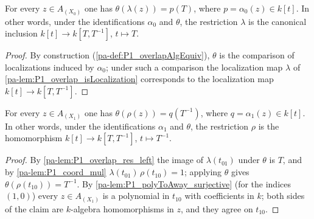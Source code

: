 \begin{lemma}
  \label{pa-lem:P1_overlap_res_left}
  \leanok

  For every \(z \in A_{(X_0)}\) one has \(\theta(\lambda(z)) = p(T)\), where
  \(p = \alpha_0(z) \in k[t]\). In other words, under the identifications
  \(\alpha_0\) and \(\theta\), the restriction \(\lambda\) is the canonical inclusion
  \(k[t] \to k[T, T^{-1}]\), \(t \mapsto T\).
\end{lemma}
\begin{proof}
  \leanok
  By construction (\ref{pa-def:P1_overlapAlgEquiv}), \(\theta\) is the comparison of
  localizations induced by \(\alpha_0\); under such a comparison the localization map
  \(\lambda\) of \ref{pa-lem:P1_overlap_isLocalization} corresponds to the localization map
  \(k[t] \to k[T, T^{-1}]\).
\end{proof}

\begin{lemma}
  \label{pa-lem:P1_overlap_res_right}
  \leanok

  For every \(z \in A_{(X_1)}\) one has \(\theta(\rho(z)) = q(T^{-1})\), where
  \(q = \alpha_1(z) \in k[t]\). In other words, under the identifications \(\alpha_1\) and
  \(\theta\), the restriction \(\rho\) is the homomorphism \(k[t] \to k[T, T^{-1}]\),
  \(t \mapsto T^{-1}\).
\end{lemma}
\begin{proof}
  \leanok
  By \ref{pa-lem:P1_overlap_res_left} the image of \(\lambda(t_{01})\) under \(\theta\) is
  \(T\), and by \ref{pa-lem:P1_coord_mul} \(\lambda(t_{01})\,\rho(t_{10}) = 1\); applying
  \(\theta\) gives \(\theta(\rho(t_{10})) = T^{-1}\). By
  \ref{pa-lem:P1_polyToAway_surjective} (for the indices \((1,0)\)) every \(z \in A_{(X_1)}\)
  is a polynomial in \(t_{10}\) with coefficients in \(k\); both sides of the claim are
  \(k\)-algebra homomorphisms in \(z\), and they agree on \(t_{10}\).
\end{proof}

